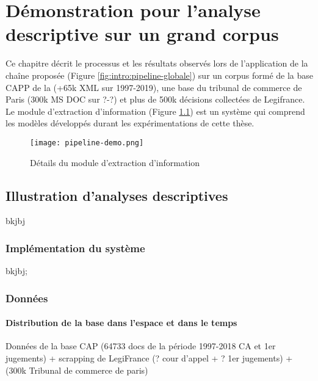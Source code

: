 \chapter{Démonstration pour l'analyse descriptive sur un grand corpus}
\label{chap:demo}
Ce chapitre décrit le processus et les résultats observés lors de l'application de la chaîne proposée (Figure \ref{fig:intro:pipeline-globale}) sur un corpus formé de la base CAPP de la \citet{dila2019capp} (+65k XML sur 1997-2019), une base du tribunal de commerce de Paris (300k MS DOC sur ?-?) et plus de 500k décisions collectées de Legifrance. Le module d'extraction d'information (Figure \ref{fig:demo:module-extraction}) est un système qui comprend les modèles développés durant les expérimentations de cette thèse. 


\begin{figure}[!htb]
	\centering 
	\texttt{[image: pipeline-demo.png]}
	\caption{Détails du module d'extraction d'information}\label{fig:demo:module-extraction}
\end{figure}


\section{Illustration d'analyses descriptives}
\label{sec:demo:experimentations}

bkjbj


\subsection{Implémentation du système}

bkjbj;


\subsection{Données}
\subsubsection{Distribution de la base dans l'espace et dans le temps}

Données de la base CAP (64733 docs de la période 1997-2018 CA et 1er jugements) + scrapping de LegiFrance (? cour d'appel + ? 1er jugements) +  (300k Tribunal de commerce de paris)


